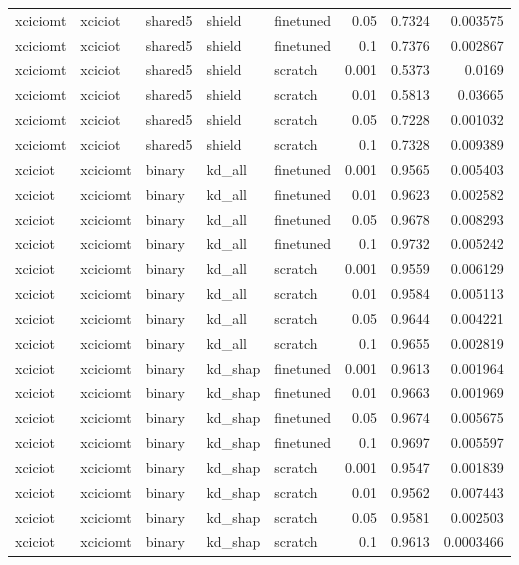 \begin{table}
\begin{tabular}{lllllrrr}
xciciomt & xciciot & shared5 & shield & finetuned & 0.05 & 0.7324 & 0.003575 \\
xciciomt & xciciot & shared5 & shield & finetuned & 0.1 & 0.7376 & 0.002867 \\
xciciomt & xciciot & shared5 & shield & scratch & 0.001 & 0.5373 & 0.0169 \\
xciciomt & xciciot & shared5 & shield & scratch & 0.01 & 0.5813 & 0.03665 \\
xciciomt & xciciot & shared5 & shield & scratch & 0.05 & 0.7228 & 0.001032 \\
xciciomt & xciciot & shared5 & shield & scratch & 0.1 & 0.7328 & 0.009389 \\
xciciot & xciciomt & binary & kd_all & finetuned & 0.001 & 0.9565 & 0.005403 \\
xciciot & xciciomt & binary & kd_all & finetuned & 0.01 & 0.9623 & 0.002582 \\
xciciot & xciciomt & binary & kd_all & finetuned & 0.05 & 0.9678 & 0.008293 \\
xciciot & xciciomt & binary & kd_all & finetuned & 0.1 & 0.9732 & 0.005242 \\
xciciot & xciciomt & binary & kd_all & scratch & 0.001 & 0.9559 & 0.006129 \\
xciciot & xciciomt & binary & kd_all & scratch & 0.01 & 0.9584 & 0.005113 \\
xciciot & xciciomt & binary & kd_all & scratch & 0.05 & 0.9644 & 0.004221 \\
xciciot & xciciomt & binary & kd_all & scratch & 0.1 & 0.9655 & 0.002819 \\
xciciot & xciciomt & binary & kd_shap & finetuned & 0.001 & 0.9613 & 0.001964 \\
xciciot & xciciomt & binary & kd_shap & finetuned & 0.01 & 0.9663 & 0.001969 \\
xciciot & xciciomt & binary & kd_shap & finetuned & 0.05 & 0.9674 & 0.005675 \\
xciciot & xciciomt & binary & kd_shap & finetuned & 0.1 & 0.9697 & 0.005597 \\
xciciot & xciciomt & binary & kd_shap & scratch & 0.001 & 0.9547 & 0.001839 \\
xciciot & xciciomt & binary & kd_shap & scratch & 0.01 & 0.9562 & 0.007443 \\
xciciot & xciciomt & binary & kd_shap & scratch & 0.05 & 0.9581 & 0.002503 \\
xciciot & xciciomt & binary & kd_shap & scratch & 0.1 & 0.9613 & 0.0003466 \\

\end{tabular}
\end{table}
